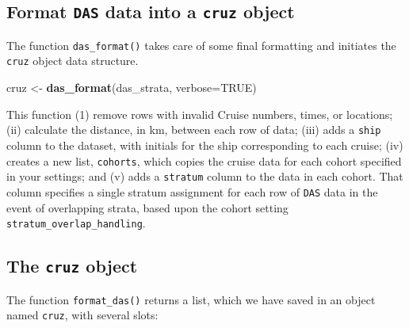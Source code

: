 \documentclass[
]{book}
\newenvironment{Shaded}{\begin{snugshade}}{\end{snugshade}}
\newcommand{\DataTypeTok}[1]{\textcolor[rgb]{0.13,0.29,0.53}{#1}}
\newcommand{\DecValTok}[1]{\textcolor[rgb]{0.00,0.00,0.81}{#1}}
\newcommand{\KeywordTok}[1]{\textcolor[rgb]{0.13,0.29,0.53}{\textbf{#1}}}
\newcommand{\NormalTok}[1]{#1}
\newcommand{\OperatorTok}[1]{\textcolor[rgb]{0.81,0.36,0.00}{\textbf{#1}}}
\newcommand{\OtherTok}[1]{\textcolor[rgb]{0.56,0.35,0.01}{#1}}
\newcommand{\StringTok}[1]{\textcolor[rgb]{0.31,0.60,0.02}{#1}}
\begin{document}
\hypertarget{format-das-data-into-a-cruz-object}{%
\subsection*{\texorpdfstring{Format \texttt{DAS} data into a \texttt{cruz} object}{Format DAS data into a cruz object}}\label{format-das-data-into-a-cruz-object}}

The function \texttt{das\_format()} takes care of some final formatting and initiates the \texttt{cruz} object data structure.

\begin{Shaded}
\begin{Highlighting}[]
\NormalTok{cruz <-}\StringTok{ }\KeywordTok{das_format}\NormalTok{(das_strata, }\DataTypeTok{verbose=}\OtherTok{TRUE}\NormalTok{)}
\end{Highlighting}
\end{Shaded}

This function (1) remove rows with invalid Cruise numbers, times, or locations; (ii) calculate the distance, in km, between each row of data; (iii) adds a \texttt{ship} column to the dataset, with initials for the ship corresponding to each cruise; (iv) creates a new list, \texttt{cohorts}, which copies the cruise data for each cohort specified in your settings; and (v) adds a \texttt{stratum} column to the data in each cohort. That column specifies
a single stratum assignment for each row of \texttt{DAS} data in the event of overlapping strata, based upon the cohort setting \texttt{stratum\_overlap\_handling}.

\hypertarget{the-cruz-object}{%
\subsection*{\texorpdfstring{The \texttt{cruz} object}{The cruz object}}\label{the-cruz-object}}

The function \texttt{format\_das()} returns a list, which we have saved in an object named \texttt{cruz}, with several slots:

\begin{Shaded}
\end{Shaded}
\end{document}
